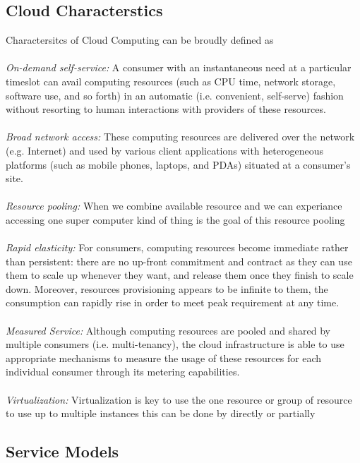 \documentclass[12pt]{report}
\begin{document}
\subsection{Cloud Characterstics}
Charactersitcs of Cloud Computing can be broudly defined as \\
\\
\textit{On-demand self-service:} A consumer with an instantaneous need at a particular timeslot can avail computing resources (such as CPU time, network storage, software use, and so forth) in an automatic (i.e. convenient, self-serve) fashion without resorting to human interactions with providers of these resources.\\
\\
\textit{Broad network access:} These computing resources are delivered over the network (e.g. Internet) and used by various client applications with heterogeneous platforms (such as mobile phones, laptops, and PDAs) situated at a consumer's site.\\
\\
\textit{Resource pooling:} When we combine available resource and we can experiance accessing one super computer kind of thing is the goal of this resource pooling\\
\\
\textit{Rapid elasticity:} For consumers, computing resources become immediate rather than persistent: there are no up-front commitment and contract as they can use them to scale up whenever they want, and release them once they finish to scale down. Moreover, resources provisioning appears to be infinite to them, the consumption can rapidly rise in order to meet peak requirement at any time.\\
\\
\textit{Measured Service:} Although computing resources are pooled and shared by multiple consumers (i.e. multi-tenancy), the cloud infrastructure is able to use appropriate mechanisms to measure the usage of these resources for each individual consumer through its metering capabilities.\\
\\
\textit{Virtualization:} Virtualization is key to use the one resource or group of resource to use up to multiple instances this can be done by directly or partially

\subsection{Service Models}
\end{document}
